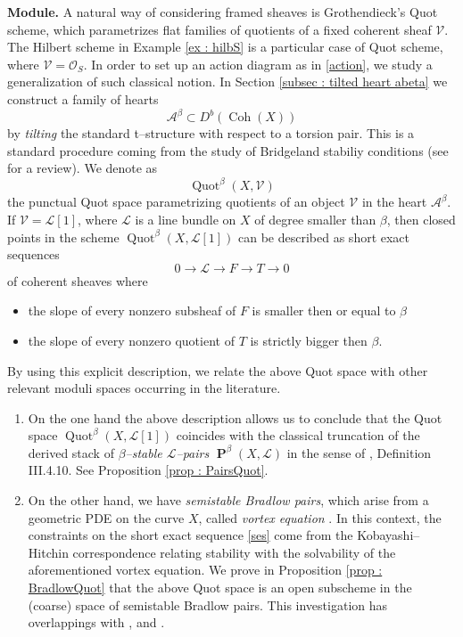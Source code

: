 \documentclass[11pt]{article}
\newcommand{\abeta}{\mathcal{A}^{\beta}}
\newcommand{\coh}{\operatorname{Coh}}
\newcommand{\framing}{\mathcal{V}}
\newcommand{\linebundle}{\mathcal{L}}
\newcommand{\pairslb}{\boldsymbol{\operatorname{P}}^{\beta}(X,\mathcal{L})}
\newcommand{\Quotbetaone}{\operatorname{Quot}^{\beta}(X,\mathcal{L}[1])}
\begin{document}
\noindent\textbf{Module.} A natural way of considering {framed sheaves} is Grothendieck's Quot scheme, which parametrizes flat families of quotients of a fixed coherent sheaf $\framing$. The Hilbert scheme in Example \ref{ex : hilbS} is a particular case of Quot scheme, where $\framing = \mathcal{O}_S$. In order to set up an action diagram as in \eqref{action}, we study a generalization of such classical notion. In Section \ref{subsec : tilted heart abeta} we construct a family of hearts
\begin{equation}\label{tilted hearts}
    \abeta \subset D^b(\coh(X))
\end{equation}
by \textit{tilting} the standard t--structure with respect to a torsion pair. This is a standard procedure coming from the study of Bridgeland stabiliy conditions \cite{bridgeland2006stabilityconditionstriangulatedcategories} (see \cite{macri2019lecturesbridgelandstability} for a review). We denote as
    $$\operatorname{Quot}^\beta(X,\framing)$$ 
the punctual Quot space parametrizing quotients of an object $\framing$ in the heart $\abeta$. If $\framing =\linebundle[1]$, where $\linebundle$ is a line bundle on $X$ of degree smaller than $\beta$, then closed points in the scheme $\Quotbetaone$ can be described as short exact sequences
\begin{equation}\label{ses}
   0\rightarrow \linebundle \rightarrow F \rightarrow T \rightarrow 0
\end{equation}
of coherent sheaves where
\begin{itemize}
    \item the slope of every nonzero subsheaf of $F$ is smaller then or equal to $\beta$
    \item the slope of every nonzero quotient of $T$ is strictly bigger then $\beta$.
\end{itemize}
By using this explicit description, we relate the above Quot space with other relevant moduli spaces occurring in the literature.
\begin{enumerate}
    \item On the one hand the above description allows us to conclude that the Quot space $\Quotbetaone$ coincides with the classical truncation of the derived stack of \textit{$\beta$--stable $\linebundle$--pairs} $\pairslb$ in the sense of \cite{dps}, Definition III.4.10. See Proposition \ref{prop : PairsQuot}.

    \item On the other hand, we have \textit{semistable Bradlow pairs}, which arise from a geometric PDE on the curve $X$, called \textit{vortex equation} \cite{bradlow1, bradlow1993birationalequivalencesvortexmoduli}. In this context, the constraints on the short exact sequence \eqref{ses} come from the Kobayashi--Hitchin correspondence relating stability with the solvability of the aforementioned vortex equation. We prove in Proposition \ref{prop : BradlowQuot} that the above Quot space is an open subscheme in the (coarse) space of semistable Bradlow pairs. This investigation has overlappings with \cite{Rota_2021}, and \cite{10.4134/JKMS.J230331}.
\end{enumerate}
\end{document}
